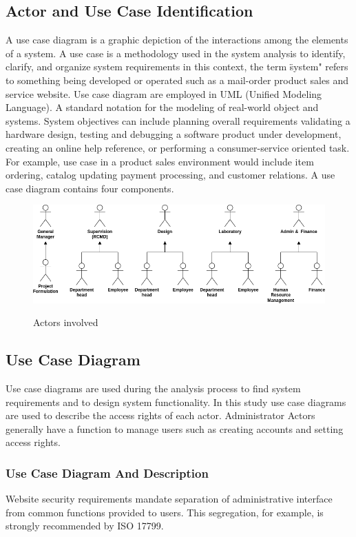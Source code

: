 \subsection{Actor and Use Case Identification}
A use case diagram is a graphic depiction of the interactions among the elements of a system. A use case is a methodology used in the system analysis to identify, clarify, and organize system requirements in this context, the term \"system" refers to something being developed or operated such as a mail-order product sales and service website. Use case diagram are employed in UML (Unified Modeling Language). A standard notation for the modeling of real-world object and systems. System objectives can include planning overall requirements validating a hardware design, testing and debugging a software product under development, creating an online help reference, or performing a consumer-service oriented task. For example, use case in a product sales environment would include item ordering, catalog updating payment processing, and customer relations. A use case diagram contains four components.

\begin{figure}[!h]
\includegraphics[width=13cm, keepaspectratio]{usecases/actors.png}
\label{shop_actors}
\caption{Actors involved }
\end{figure}

\subsection{Use Case Diagram}

Use case diagrams are used during the analysis
process to find system requirements and to design
system functionality. In this study use case
diagrams are used to describe the access rights of
each actor. Administrator Actors generally have a
function to manage users such as creating accounts
and setting access rights.

\subsubsection{Use Case Diagram And Description}
Website security requirements mandate separation of administrative interface from common functions provided to users. This segregation, for example, is strongly recommended by ISO 17799.

